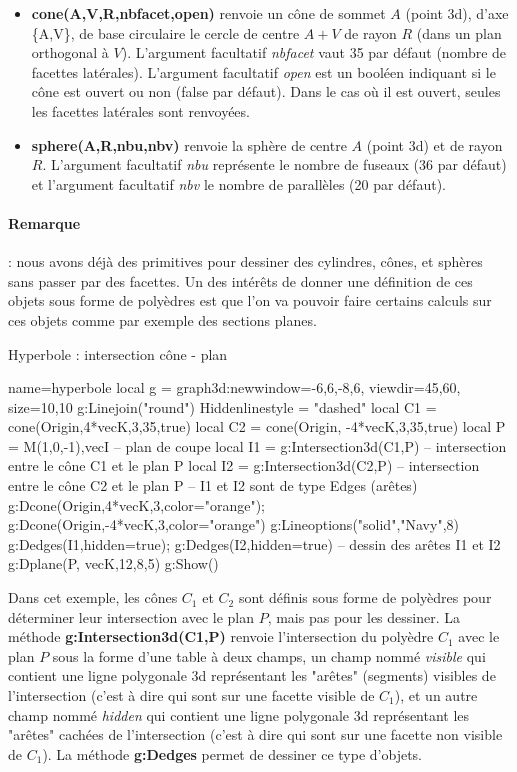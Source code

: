 \begin{itemize}
    \item \textbf{cone(A,V,R,nbfacet,open)} renvoie un cône de sommet $A$ (point 3d), d'axe \{A,V\}, de base circulaire le cercle de centre $A+V$ de rayon $R$ (dans un plan orthogonal à $V$). L'argument facultatif \emph{nbfacet} vaut 35 par défaut (nombre de facettes latérales). L'argument facultatif \emph{open} est un booléen indiquant si le cône est ouvert ou non (false par défaut). Dans le cas où il est ouvert, seules les facettes latérales sont renvoyées.

    \item \textbf{sphere(A,R,nbu,nbv)} renvoie la sphère de centre $A$ (point 3d) et de rayon $R$. L'argument facultatif \emph{nbu} représente le nombre de fuseaux (36 par défaut) et l'argument facultatif \emph{nbv} le nombre de parallèles (20 par défaut).
\end{itemize}

\paragraph{Remarque} : nous avons déjà des primitives pour dessiner des cylindres, cônes, et sphères sans passer par des facettes. Un des intérêts de donner une définition de ces objets sous forme de polyèdres est que l'on va pouvoir faire certains calculs sur ces objets comme par exemple des sections planes.

\begin{demo}{Hyperbole : intersection cône - plan}
\begin{luadraw}{name=hyperbole}
local g = graph3d:new{window={-6,6,-8,6}, viewdir={45,60}, size={10,10}}
g:Linejoin("round")
Hiddenlinestyle = "dashed"
local C1 = cone(Origin,4*vecK,3,35,true)
local C2 = cone(Origin, -4*vecK,3,35,true)
local P = {M(1,0,-1),vecI} -- plan de coupe
local I1 = g:Intersection3d(C1,P) -- intersection entre le cône C1 et le plan P
local I2 = g:Intersection3d(C2,P) -- intersection entre le cône C2 et le plan P
-- I1 et I2 sont de type Edges (arêtes)
g:Dcone(Origin,4*vecK,3,{color="orange"}); g:Dcone(Origin,-4*vecK,3,{color="orange"})
g:Lineoptions("solid","Navy",8)
g:Dedges(I1,{hidden=true}); g:Dedges(I2,{hidden=true}) -- dessin des arêtes I1 et I2
g:Dplane(P, vecK,12,8,5)
g:Show()
\end{luadraw}
\end{demo}

Dans cet exemple, les cônes $C_1$ et $C_2$ sont définis sous forme de polyèdres pour déterminer leur intersection avec le plan $P$, mais pas pour les dessiner. La méthode \textbf{g:Intersection3d(C1,P)} renvoie l'intersection du polyèdre $C_1$ avec le plan $P$ sous la forme d'une table à deux champs, un champ nommé \emph{visible} qui contient une ligne polygonale 3d représentant les "arêtes" (segments) visibles de l'intersection (c'est à dire qui sont sur une facette visible de $C_1$), et un autre champ nommé \emph{hidden} qui contient une ligne polygonale 3d représentant les "arêtes" cachées de l'intersection (c'est à dire qui sont sur une facette non visible de $C_1$). La méthode \textbf{g:Dedges} permet de dessiner ce type d'objets.

